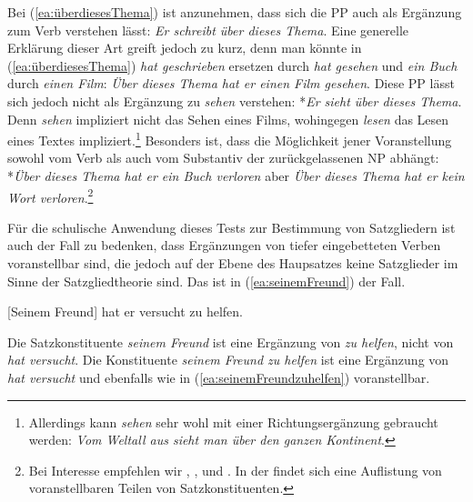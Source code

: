 \ea \label{ea:AttributVF}
\label{ea:überdiesesThema}
\label{ex:einBuchüberdiesesThema}
\label{ex:Ruhetagkeinen}
\label{ex:keinenRuhetag}
\label{ex:*keinen} 
\z 
\z 

Bei (\ref{ea:überdiesesThema}) ist anzunehmen, dass sich die PP auch als Ergänzung zum Verb verstehen lässt: \textit{Er schreibt über dieses Thema}. Eine generelle Erklärung dieser Art greift jedoch zu kurz, denn man könnte in (\ref{ea:überdiesesThema}) \textit{hat geschrieben} ersetzen durch \textit{hat gesehen} und \textit{ein Buch} durch \textit{einen Film}: \textit{Über dieses Thema hat er einen Film gesehen}. Diese PP lässt sich jedoch nicht als Ergänzung zu \textit{sehen} verstehen: *\textit{Er sieht über dieses Thema}. Denn \textit{sehen} impliziert nicht das Sehen eines Films, wohingegen \textit{lesen} das Lesen eines Textes impliziert.\footnote{Allerdings kann \textit{sehen} sehr wohl mit einer Richtungsergänzung gebraucht werden: \textit{Vom Weltall aus sieht man über den ganzen Kontinent}.} Besonders ist, dass die Möglichkeit jener Voranstellung sowohl vom Verb als auch vom Substantiv der zurückgelassenen NP abhängt: *\textit{Über dieses Thema hat er ein Buch verloren} aber \textit{Über dieses Thema hat er kein Wort verloren}.\footnote{Bei Interesse empfehlen wir \citet{Pafel1995}, \citet[Kapitel 12] {Mueller1999}, \citet{Mueller2005Satzstruktur} und \citet[107--113] {Welke2007}. In der \citet[64--65, §37; 68--70, §39]{Duden2022} findet sich eine Auflistung von voranstellbaren Teilen von Satzkonstituenten.} 

Für die schulische Anwendung dieses Tests zur Bestimmung von Satzgliedern ist auch der Fall zu bedenken, dass Ergänzungen von tiefer eingebetteten Verben voranstellbar sind, die jedoch auf der Ebene des Haupsatzes keine Satzglieder im Sinne der Satzgliedtheorie sind. Das ist in (\ref{ea:seinemFreund}) der Fall.

\ea \label{ea:seinemFreund} [Seinem Freund] hat er versucht zu helfen.
\z 

Die Satzkonstituente \textit{seinem Freund} ist eine Ergänzung von \textit{zu helfen}, nicht von \textit{hat versucht}. Die Konstituente \textit{seinem Freund zu helfen} ist eine Ergänzung von \textit{hat versucht} und ebenfalls wie in (\ref{ea:seinemFreundzuhelfen}) voranstellbar.

